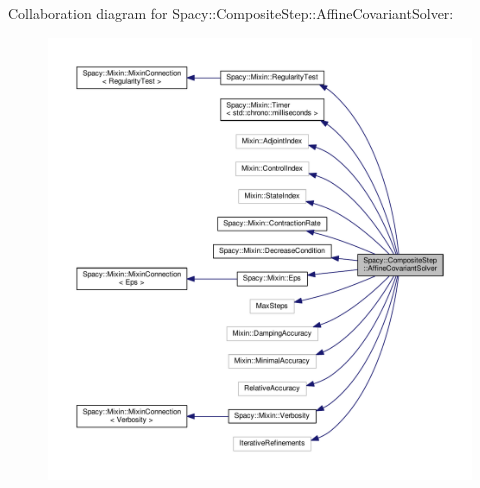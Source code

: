 Collaboration diagram for Spacy\-:\-:Composite\-Step\-:\-:Affine\-Covariant\-Solver\-:
\nopagebreak
\begin{figure}[H]
\begin{center}
\leavevmode
\includegraphics[width=350pt]{classSpacy_1_1CompositeStep_1_1AffineCovariantSolver__coll__graph}
\end{center}
\end{figure}
